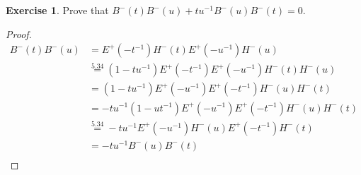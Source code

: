 \documentclass[12pt]{extarticle}
\newcommand{\<}{\langle}
\renewcommand{\>}{\rangle}
\theoremstyle{definition}
\newtheorem{exercise}{Exercise}
\begin{document}
\begin{exercise}
  Prove that $B^-(t)B^-(u) +tu^{-1}B^-(u)B^-(t) = 0$.
\end{exercise}
\begin{proof}
  \begin{align*}
    B^-(t)B^-(u)
    &=
    E^+(-t^{-1})H^-(t) E^+(-u^{-1})H^-(u) \\
    &\overset{5.34}{=}
    (1-tu^{-1})E^+(-t^{-1})E^+(-u^{-1})H^{-}(t)H^-(u) \\
    &=
    (1-tu^{-1})E^+(-u^{-1})E^+(-t^{-1})H^-(u)H^{-}(t) \\
    &=
    -tu^{-1}(1-ut^{-1})E^+(-u^{-1})E^+(-t^{-1})H^-(u)H^{-}(t) \\
    &\overset{5.34}{=}
    -tu^{-1}E^+(-u^{-1})H^-(u)E^+(-t^{-1})H^{-}(t)  \\
    &=
    -tu^{-1}B^-(u)B^-(t) \\
  \end{align*}
\end{proof}
\end{document}
